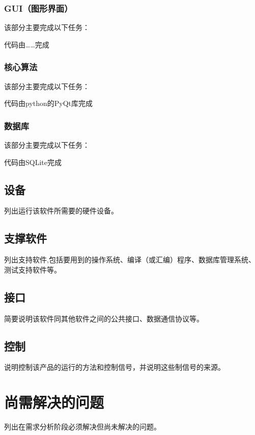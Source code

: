 \documentclass[a4paper]{ctexart}%
\begin{document}
	\subsubsection{GUI（图形界面）}
	该部分主要完成以下任务：
	
	
	代码由……完成
	\subsubsection{核心算法}
	该部分主要完成以下任务：
	
	
	代码由python的PyQt库完成
	
	
	\subsubsection{数据库}
	该部分主要完成以下任务：
	
	代码由SQLite完成  
	\subsection{设备}  
	列出运行该软件所需要的硬件设备。  
	\subsection{支撑软件}
	列出支持软件,包括要用到的操作系统、编译（或汇编）程序、数据库管理系统、测试支持软件等。
	\subsection{接口}  
	简要说明该软件同其他软件之间的公共接口、数据通信协议等。  
	\subsection{控制}  
	说明控制该产品的运行的方法和控制信号，并说明这些制信号的来源。     
	\section{尚需解决的问题}
	列出在需求分析阶段必须解决但尚未解决的问题。
	
	
\end{document}
